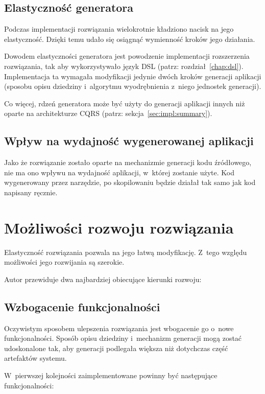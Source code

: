 \subsection{Elastyczność generatora}

Podczas implementacji rozwiązania wielokrotnie kładziono nacisk na jego elastyczność.
Dzięki temu udało się osiągnąć wymienność kroków jego działania.

Dowodem elastyczności generatora jest powodzenie implementacji rozszerzenia rozwiązania, tak aby wykorzystywało język DSL (patrz: rozdział~\ref{chap:dsl}).
Implementacja ta wymagała modyfikacji jedynie dwóch kroków generacji aplikacji (sposobu opisu dziedziny i~algorytmu wyodrębnienia z~niego jednostek generacji).

Co więcej, rdzeń generatora może być użyty do generacji aplikacji innych niż oparte na architekturze CQRS (patrz: sekcja~\ref{sec:impl:summary}).


\subsection{Wpływ na wydajność wygenerowanej aplikacji}

Jako że rozwiązanie zostało oparte na mechanizmie generacji kodu źródłowego, nie ma ono wpływu na wydajność aplikacji, w~której zostanie użyte.
Kod wygenerowany przez narzędzie, po skopilowaniu będzie działał tak samo jak kod napisany ręcznie.



\section{Możliwości rozwoju rozwiązania}

Elastyczność rozwiązania pozwala na jego łatwą modyfikację.
Z~tego względu możliwości jego rozwijania są szerokie.

Autor przewiduje dwa najbardziej obiecujące kierunki rozwoju:


\subsection{Wzbogacenie funkcjonalności}

Oczywistym sposobem ulepszenia rozwiązania jest wbogacenie go o~nowe funkcjonalności.
Sposób opisu dziedziny i~mechanizm generacji mogą zostać udoskonalone tak, aby generacji podlegała większa niż dotychczas część artefaktów systemu.

W~pierwszej kolejności zaimplementowane powinny być następujące funkcjonalności:

